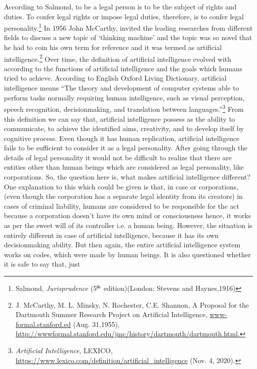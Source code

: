\begin{multicols}{2}
\noi
According to Salmond, to be a legal person is to be the subject of rights and duties. To
confer legal rights or impose legal duties, therefore, is to confer legal personality.\footnote{Salmond, \textit{Jurisprudence} (5$^{\rm th}$ edition)(London: Stevens and Haynes,1916)}
In 1956
John McCarthy, invited the leading researches from different fields to discuss a new topic of
‘thinking machine’ and the topic was so novel that he had to coin his own term for reference
and it was termed as artificial intelligence.\footnote{J. McCarthy, M. L. Minsky, N. Rochester, C.E. Shannon, A Proposal for the Dartmouth Summer Research
Project on Artificial Intelligence, \url{www-formal.stanford.ed} (Aug. 31,1955), \url{http://wwwformal.stanford.edu/jmc/history/dartmouth/dartmouth.html.}}
Over time, the definition of artificial intelligence
evolved with according to the functions of artificial intelligence and the goals which humans
tried to achieve. According to English Oxford Living Dictionary, artificial intelligence
means “The theory and development of computer systems able to perform tasks normally
requiring human intelligence, such as visual perception, speech recognition, decisionmaking, and translation between languages.”\footnote{\textit{Artificial Intelligence}, LEXICO, \url{https://www.lexico.com/definition/artificial_intelligence} (Nov. 4, 2020). }
 From this definition we can say that, artificial
intelligence possess as the ability to communicate, to achieve the identified aims, creativity, and to develop itself by cognitive process. Even though it has human replication, artificial
intelligence fails to be sufficient to consider it as a legal personality. After going through the
details of legal personality it would not be difficult to realize that there are entities other than
human beings which are considered as legal personality, like corporations. So, the question
here is, what makes artificial intelligence different? One explanation to this which could be
given is that, in case or corporations, (even though the corporation has a separate legal
identity from its creators) in cases of criminal liability, humans are considered to be
responsible for the act because a corporation doesn’t have its own mind or consciousness
hence, it works as per the sweet will of its controller i.e. a human being. However, the
situation is entirely different in case of artificial intelligence, because it has its own decisionmaking ability. But then again, the entire artificial intelligence system works on codes,
which were made by human beings. It is also questioned whether it is safe to say that, just

\end{multicols}
